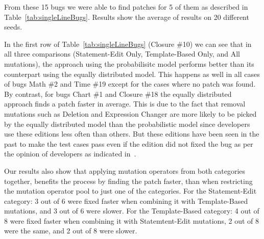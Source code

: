 \documentclass[conference]{IEEEtran}
\begin{document}
From these 15 bugs we were able to find patches for 5 of them as described in
Table~\ref{tab:singleLineBugs}. Results show the average of results on 
20 different seeds.  

In the first row of Table~\ref{tab:singleLineBugs} (Closure \#10) we can see
that in all three comparisons (Statement-Edit Only, Template-Based Only, and All
mutations), the approach using the probabilisitc model performs better than its
counterpart using the equally distributed model. This happens as well in all
cases of bugs Math \#2 and Time \#19 except for the cases where no patch was
found. By contrast, for bugs Chart \#1 and Closure \#18 the equally
distributed approach finds a patch faster in average. This is due to the fact
that removal mutations such as Deletion and Expression Changer are more likely
to be picked by the equally distributed model than the probabilistic model since
developers use these editions less often than others. But these editions have
been seen in the past to make the test cases pass even if the edition did not
fixed the bug as per the opinion of developers as indicated in~\cite{kim2013}. 

Our results also show that applying mutation operators from both categories
together, benefits the process by finding the patch faster, than when
restricting the mutation operator pool to just one of the categories. For the
Statement-Edit category: 3 out of 6 were fixed faster when combining it with
Template-Based mutations, and 3 out of 6 were slower. For the Template-Based
category: 4 out of 8 were fixed faster when combining it with Statemtent-Edit
mutations, 2 out of 8 were the same, and 2 out of 8 were slower. 
\end{document}
